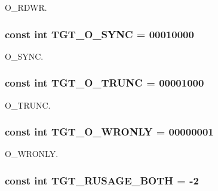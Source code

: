 O\_\-RDWR. \hypertarget{classArmLinux64_abf43ab05d2a5b6b8113952160d8565db}{
\subsubsection[{TGT\_\-O\_\-SYNC}]{\setlength{\rightskip}{0pt plus 5cm}const int {\bf TGT\_\-O\_\-SYNC} = 00010000}}
\label{classArmLinux64_abf43ab05d2a5b6b8113952160d8565db}


O\_\-SYNC. \hypertarget{classArmLinux64_a4f892ee6e1424a2becd859b0bef1f18b}{
\subsubsection[{TGT\_\-O\_\-TRUNC}]{\setlength{\rightskip}{0pt plus 5cm}const int {\bf TGT\_\-O\_\-TRUNC} = 00001000}}
\label{classArmLinux64_a4f892ee6e1424a2becd859b0bef1f18b}


O\_\-TRUNC. \hypertarget{classArmLinux64_a6156c069cefe05ce3cce033b2e0c2de2}{
\subsubsection[{TGT\_\-O\_\-WRONLY}]{\setlength{\rightskip}{0pt plus 5cm}const int {\bf TGT\_\-O\_\-WRONLY} = 00000001}}
\label{classArmLinux64_a6156c069cefe05ce3cce033b2e0c2de2}


O\_\-WRONLY. \hypertarget{classArmLinux64_af555fb2e49227259e6f6a78e2f6996e4}{
\subsubsection[{TGT\_\-RUSAGE\_\-BOTH}]{\setlength{\rightskip}{0pt plus 5cm}const int {\bf TGT\_\-RUSAGE\_\-BOTH} = -\/2}}
\label{classArmLinux64_af555fb2e49227259e6f6a78e2f6996e4}


